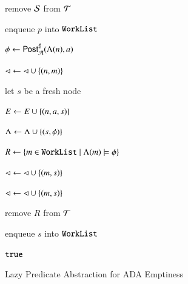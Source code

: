 \documentclass[10pt]{llncs}
\begin{document}
\begin{algorithm}[t!]
{\begin{algorithmic}[1]
  \State remove $\mathcal{S}$ from $\mathcal{T}$

  \State enqueue $p$ into $\mathtt{WorkList}$
  \label{ln:refine}

  \EndFor

  \EndIf

  \Else \label{ln:else}

  \label{ln:forall-events}

  \State $\phi \leftarrow {\mathsf{Post}}^\sharp_{\mathcal{A}}(\Lambda(n),a)$

   \label{ln:covered}

  \State $\lhd \leftarrow \lhd \cup \left\{ (n,m) \right\}$ 
  \label{ln:direct-cover}

  \Else 

  \State let $s$ be a fresh node

  \State $E \leftarrow E \cup \left\{ (n,a,s) \right\}$

  \State $\Lambda \leftarrow \Lambda \cup \left\{ (s,\phi) \right\}$

  \State $R \leftarrow \left\{ m \in \mathtt{WorkList} \mid \Lambda(m) \models
    \phi \right\}$ 

  

  \State $\lhd \leftarrow \lhd \cup \left\{ (m,s) \right\}$ 
  \label{ln:child-cover}

  \EndFor


  \State $\lhd \leftarrow \lhd \cup \left\{ (m,s) \right\}$ 
  \label{ln:indirect-cover}

  \EndFor

  \EndFor

  \State remove $R$ from $\mathcal{T}$

  \State enqueue $s$ into $\mathtt{WorkList}$ 
  \label{ln:expand}

  \EndIf

  \EndFor

  \EndIf

  \EndWhile

   $\mathtt{true}$
  \label{ln:true}
\end{algorithmic}}
\caption{Lazy Predicate Abstraction for ADA Emptiness}
\label{alg:predabs}
\end{algorithm}
\end{document}
